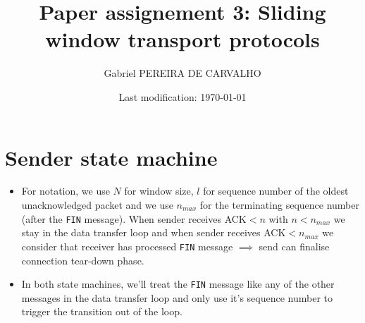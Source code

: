 \documentclass[]{article}
\title{Paper assignement 3: Sliding window transport protocols}
\author{Gabriel PEREIRA DE CARVALHO}
\date{Last modification: \today}
\begin{document}
	
	\maketitle
	
	\newpage
	
	\section{Sender state machine}
	
	\begin{itemize}
		\item For notation, we use $N$ for window size, $l$ for sequence number of the oldest unacknowledged packet and we use $n_{max}$ for the terminating sequence number (after the \texttt{FIN} message). When sender receives ACK$<n$ with $n<n_{max}$ we stay in the data transfer loop and when sender receives ACK$<n_{max}$ we consider that receiver has processed \texttt{FIN} message $\implies$ send can finalise connection tear-down phase.
		\item In both state machines, we'll treat the \texttt{FIN} message like any of the other messages in the data transfer loop and only use it's sequence number to trigger the transition out of the loop.
	\end{itemize}
	
\end{document}
